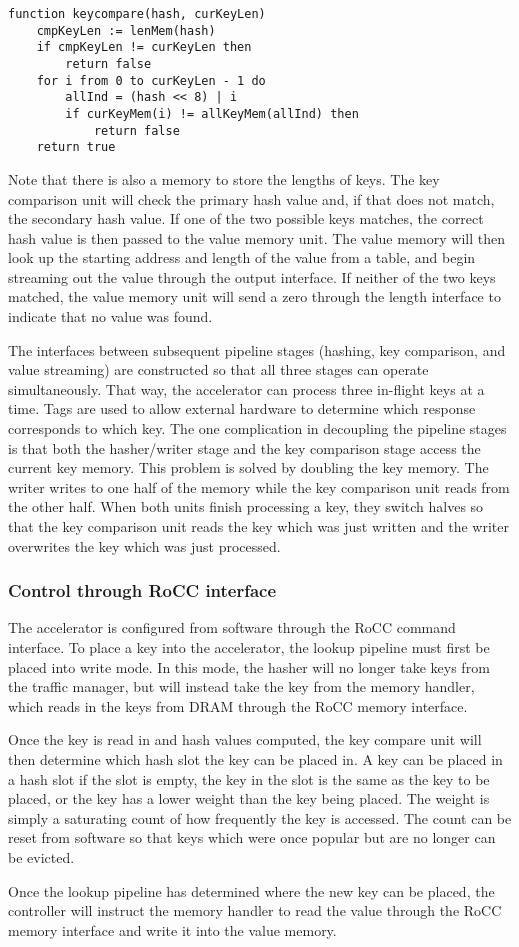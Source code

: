 \begin{verbatim}
function keycompare(hash, curKeyLen)
    cmpKeyLen := lenMem(hash)
    if cmpKeyLen != curKeyLen then
        return false
    for i from 0 to curKeyLen - 1 do
        allInd = (hash << 8) | i
        if curKeyMem(i) != allKeyMem(allInd) then
            return false
    return true
\end{verbatim}

Note that there is also a memory to store the lengths of keys.
The key comparison unit will check the primary hash value and, if that does
not match, the secondary hash value. If one of the two possible keys matches,
the correct hash value is then passed to the value memory unit. The value
memory will then look up the starting address and length of the value from a
table, and begin streaming out the value through the output interface.
If neither of the two keys matched, the value memory unit will send
a zero through the length interface to indicate that no value was found.

The interfaces between subsequent pipeline stages (hashing, key comparison,
and value streaming) are constructed so that all three stages can operate
simultaneously. That way, the accelerator can process three in-flight keys
at a time. Tags are used to allow external hardware to determine which
response corresponds to which key. The one complication in decoupling the
pipeline stages is that both the hasher/writer stage and the key comparison
stage access the current key memory. This problem is solved by doubling the
key memory. The writer writes to one half of the memory while the key
comparison unit reads from the other half. When both units finish processing
a key, they switch halves so that the key comparison unit reads the key which
was just written and the writer overwrites the key which was just processed.

\subsubsection{Control through RoCC interface}

The accelerator is configured from software through the RoCC command interface.
To place a key into the accelerator, the lookup pipeline must first be
placed into write mode. In this mode, the hasher will no longer take keys
from the traffic manager, but will instead take the key from the memory handler,
which reads in the keys from DRAM through the RoCC memory interface.

Once the key is read in and hash values computed, the key compare unit will
then determine which hash slot the key can be placed in. A key can be placed
in a hash slot if the slot is empty, the key in the slot is the same as the
key to be placed, or the key has a lower weight than the key being placed.
The weight is simply a saturating count of how frequently the key is accessed.
The count can be reset from software so that keys which were once popular but
are no longer can be evicted.

Once the lookup pipeline has determined where the new key can be placed, the
controller will instruct the memory handler to read the value through the
RoCC memory interface and write it into the value memory.
